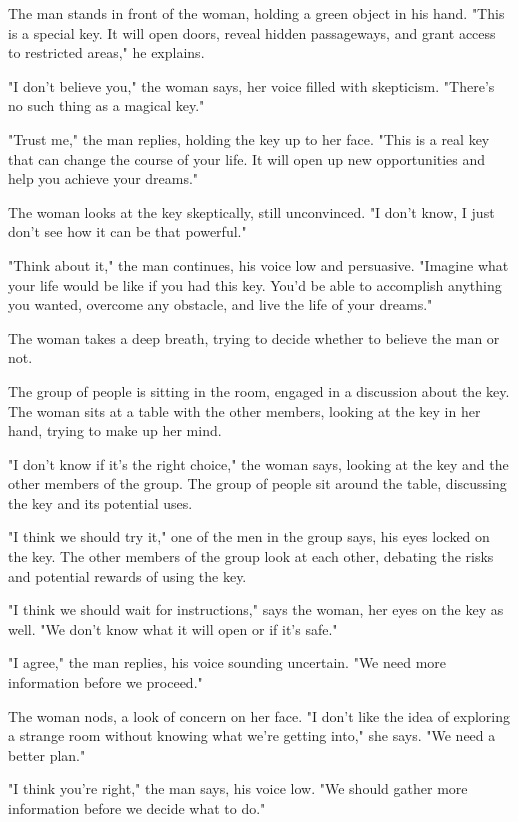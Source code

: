 \documentclass[smalldemyvopaper,11pt,twoside,onecolumn,openright,extrafontsizes]{memoir}
\begin{document}
The man stands in front of the woman, holding a green object in his hand. "This is a special key. It will open doors, reveal hidden passageways, and grant access to restricted areas," he explains.\par
"I don't believe you," the woman says, her voice filled with skepticism. "There's no such thing as a magical key."\par
"Trust me," the man replies, holding the key up to her face. "This is a real key that can change the course of your life. It will open up new opportunities and help you achieve your dreams."\par
The woman looks at the key skeptically, still unconvinced. "I don't know, I just don't see how it can be that powerful."\par
"Think about it," the man continues, his voice low and persuasive. "Imagine what your life would be like if you had this key. You'd be able to accomplish anything you wanted, overcome any obstacle, and live the life of your dreams."\par
The woman takes a deep breath, trying to decide whether to believe the man or not.\par
The group of people is sitting in the room, engaged in a discussion about the key. The woman sits at a table with the other members, looking at the key in her hand, trying to make up her mind.\par
"I don't know if it's the right choice," the woman says, looking at the key and the other members of the group. The group of people sit around the table, discussing the key and its potential uses.\par
"I think we should try it," one of the men in the group says, his eyes locked on the key. The other members of the group look at each other, debating the risks and potential rewards of using the key.\par
"I think we should wait for instructions," says the woman, her eyes on the key as well. "We don't know what it will open or if it's safe."\par
"I agree," the man replies, his voice sounding uncertain. "We need more information before we proceed."\par
The woman nods, a look of concern on her face. "I don't like the idea of exploring a strange room without knowing what we're getting into," she says. "We need a better plan."\par
"I think you're right," the man says, his voice low. "We should gather more information before we decide what to do."\par
\end{document}
